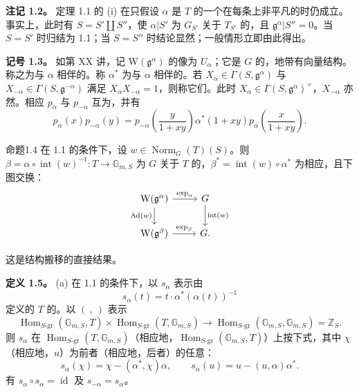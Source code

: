 \textbf{注记 1.2。} 定理 1.1 的 (i) 在只假设 $\alpha$ 是 $T$ 的一个在每条上非平凡的时仍成立。事实上，此时有 $S=S'\amalg S''$，使 $\alpha|S'$ 为 $G_{S'}$ 关于 $T_{S'}$ 的，且 $\mathfrak g^\alpha|S''=0$。当 $S=S'$ 时归结为 1.1；当 $S=S''$ 时结论显然；一般情形立即由此得出。

\textbf{记号 1.3。} 如第 XX 讲，记 $\mathrm W(\mathfrak g^\alpha)$ 的像为 $U_\alpha$；它是 $G$ 的，地带有向量结构。称之为与 $\alpha$ 相伴的。称 $\alpha^*$ 为与 $\alpha$ 相伴的。若 $X_\alpha\in\Gamma(S,\mathfrak g^\alpha)$ 与 $X_{-\alpha}\in\Gamma(S,\mathfrak g^{-\alpha})$ 满足 $X_\alpha X_{-\alpha}=1$，则称它们。此时 $X_\alpha\in\Gamma(S,\mathfrak g^\alpha)^\times$，$X_{-\alpha}$ 亦然。相应 $p_\alpha$ 与 $p_{-\alpha}$ 互为，并有
\[p_\alpha(x)p_{-\alpha}(y)=p_{-\alpha}\left(\frac y{1+xy}\right)\alpha^*(1+xy)p_\alpha\left(\frac x{1+xy}\right).\]
\begin{SGAresult}{命题}{1.4}
在 1.1 的条件下，设 $w\in\operatorname{Norm}_G(T)(S)$。则 $\beta=\alpha\circ\operatorname{int}(w)^{-1}:T\to\mathbb G_{m,S}$ 为 $G$ 关于 $T$ 的，$\beta^*=\operatorname{int}(w)\circ\alpha^*$ 为相应，且下图交换：
\[\begin{tikzcd}\mathrm W(\mathfrak g^\alpha)\arrow[r,"\exp_\alpha"]\arrow[d,"\operatorname{Ad}(w)"']&G\arrow[d,"\operatorname{int}(w)"]\\\mathrm W(\mathfrak g^\beta)\arrow[r,"\exp_\beta"]&G.\end{tikzcd}\]
\end{SGAresult}
这是结构搬移的直接结果。

\textbf{定义 1.5。} (a) 在 1.1 的条件下，以 $s_\alpha$ 表示由
\[s_\alpha(t)=t\cdot\alpha^*(\alpha(t))^{-1}\]
定义的 $T$ 的。以 $(\ ,\ )$ 表示
\[\operatorname{Hom}_{S\text{-gr}}(\mathbb G_{m,S},T)\times\operatorname{Hom}_{S\text{-gr}}(T,\mathbb G_{m,S})\longrightarrow\operatorname{Hom}_{S\text{-gr}}(\mathbb G_{m,S},\mathbb G_{m,S})=\mathbb Z_S.\]
则 $s_\alpha$ 在 $\operatorname{Hom}_{S\text{-gr}}(T,\mathbb G_{m,S})$（相应地，$\operatorname{Hom}_{S\text{-gr}}(\mathbb G_{m,S},T)$）上按下式，其中 $\chi$（相应地，$u$）为前者（相应地，后者）的任意：
\[s_\alpha(\chi)=\chi-(\alpha^*,\chi)\alpha,\qquad s_\alpha(u)=u-(u,\alpha)\alpha^*.\]
有 $s_\alpha\circ s_\alpha=\operatorname{id}$ 及 $s_{-\alpha}=s_\alpha$。

